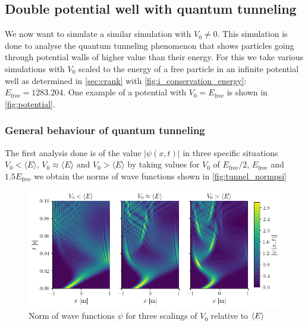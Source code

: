 \subsection{Double potential well with quantum tunneling}
We now want to simulate a similar simulation with $V_0 \neq 0$. This simulation is done to analyse the quantum tunneling phenomenon that shows particles going through potential walls of higher value than their energy. For this we take various simulations with $V_0$ scaled to the energy of a free particle in an infinite potential well as determined in \autoref{sec:crank} with \autoref{fig:i_conservation_energy}: $E_\mathrm{free} = 1283.204$. One example of a potential with $V_0 = E_\mathrm{free}$ is shown in \autoref{fig:potential}.

\subsubsection{General behaviour of quantum tunneling}
The first analysis done is of the value $|\psi(x,t)|$ in three specific situations $V_0<\langle E \rangle$, $V_0\approx\langle E \rangle$ and $V_0>\langle E \rangle$ by taking values for $V_0$ of $E_\mathrm{free}/2$, $E_\mathrm{free}$ and $1.5 E_\mathrm{free}$ we obtain the norms of wave functions shown in \autoref{fig:tunnel_normpsi}
\begin{figure}[h]
    \centering
    \includegraphics[width = \linewidth]{figures/tunnel_normpsi.png}
    \caption{Norm of wave functions $\psi$ for three scalings of $V_0$ relative to $\langle E \rangle$}
    \label{fig:tunnel_normpsi}
\end{figure}

